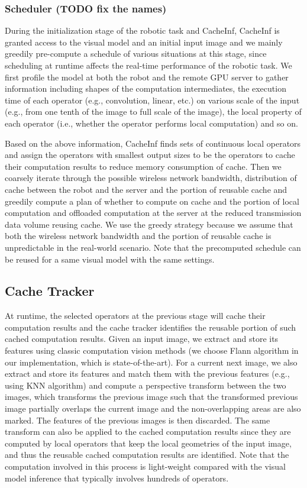 \subsubsection*{Scheduler (TODO fix the names)}
During the initialization stage of the robotic task and CacheInf, CacheInf is granted access to the visual model and an initial input image and we mainly greedily pre-compute a schedule of various situations at this stage, since scheduling at runtime affects the real-time performance of the robotic task.
We first profile the model at both the robot and the remote GPU server to gather information  including shapes of the computation intermediates, the execution time of each operator (e.g., convolution, linear, etc.) on various scale of the input (e.g., from one tenth of the image to full scale of the image), the local property of each operator (i.e., whether the operator performs local computation) and so on.

Based on the above information, CacheInf finds sets of continuous local operators and assign the operators with smallest output sizes to be the operators to cache their computation results to reduce memory consumption of cache.
Then we coarsely iterate through the possible wireless network bandwidth, distribution of cache between the robot and the server and the portion of reusable cache and greedily compute a plan of whether to compute on cache and the portion of local computation and offloaded computation at the server at the reduced transmission data volume reusing cache.
We use the greedy strategy because we assume that both the wireless network bandwidth and the portion of reusable cache is unpredictable in the real-world scenario.
Note that the precomputed schedule can be reused for a same visual model with the same settings. 

\subsection{Cache Tracker}
At runtime, the selected operators at the previous stage will cache their computation results and the cache tracker identifies the reusable portion of such cached computation results.
Given an input image, we extract and store its features using classic computation vision methods (we choose Flann algorithm in our implementation, which is state-of-the-art).
For a current next image, we also extract and store its features and match them with the previous features (e.g., using KNN algorithm) and compute a perspective transform between the two images, which transforms the previous image such that the transformed previous image partially overlaps the current image and the non-overlapping areas are also marked.
The features of the previous images is then discarded.
The same transform can also be applied to the cached computation results since they are computed by local operators that keep the local geometries of the input image, and thus the reusable cached computation results are identified.
Note that the computation involved in this process is light-weight compared with the visual model inference that typically involves hundreds of operators.

